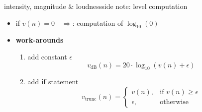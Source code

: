         \begin{frame}{intensity, magnitude \& loudness}{side note: level computation}
            \begin{itemize}
                \item if $v(n) = 0\quad\Rightarrow$: computation of $\log_{10}(0)$
                \bigskip
                \item<2-> \textbf{work-arounds}
                    \begin{enumerate}[a]
                        \item	add constant $\epsilon$
                            \begin{equation*}
                                v_\mathrm{dB}(n) = 20\cdot\log_{10}(v(n) + \epsilon)
                            \end{equation*}

                        \item<3->	add \textbf{if} statement	
                            \begin{equation*}
                                v_\mathrm{trunc}(n)  =   \left\{ 
                                            \begin{array}{ll} 
                                                v(n), & \text{if } v(n) \geq \epsilon \\
                                                \epsilon, & \text{otherwise }
                                            \end{array} 
                                            \right. 
                            \end{equation*}
                    \end{enumerate}
            \end{itemize}
        \end{frame}
        
